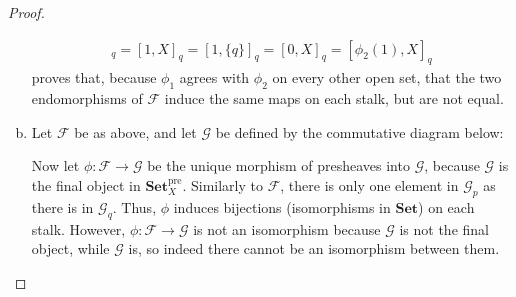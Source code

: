 \documentclass{article}
\newcommand{\fF}{\mathscr{F}}
\newcommand{\fG}{\mathscr{G}}
\newcommand{\Set}{\mathbf{Set}} %
\DeclareMathOperator{\res}{\mathrm{res}}
\let\emptyset\varnothing
\begin{document}
\begin{proof}
\begin{enumerate}[(a)]
\begin{align*}
            [\phi_1(1),X]_q=[1,X]_q=[1,\{q\}]_q=[0,X]_q=[\phi_2(1),X]_q
        \end{align*}
        proves that, because $\phi_1$ agrees with $\phi_2$ on every other open set, that the two endomorphisms of $\fF$ induce the same maps on each stalk, but are not equal.
        \item Let $\fF$ be as above, and let $\fG$ be defined by the commutative diagram below:
        \begin{center}
        \end{center}
        Now let $\phi:\fF\to \fG$ be the unique morphism of presheaves into $\fG$, because $\fG$ is the final object in $\Set^{\text{pre}}_X$. Similarly to $\fF$, there is only one element in $\fG_p$ as there is in $\fG_q$. Thus, $\phi$ induces bijections (isomorphisms in $\Set$) on each stalk. However, $\phi:\fF\to \fG$ is not an isomorphism because $\fG$ is not the final object, while $\fG$ is, so indeed there cannot be an isomorphism between them.
    \end{enumerate}
\end{proof}
\end{document}
